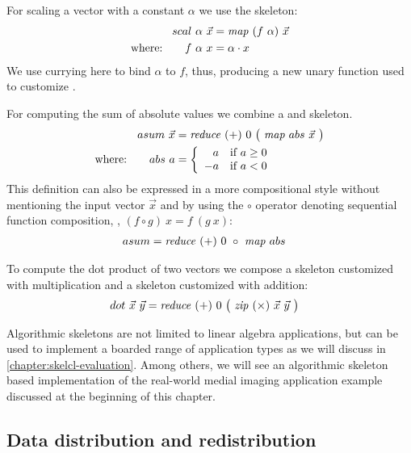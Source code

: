 For scaling a vector with a constant $\alpha$ we use the \map skeleton:
\begin{align*}
  scal\ \alpha\ \vec{x}&= \text{\textit{map}}\ (f\ \alpha)\ \vec{x}\\
  \text{where:} \qquad f\ \alpha\ x &= \alpha \cdot x
\end{align*}
We use currying here to bind $\alpha$ to $f$, thus, producing a new unary function used to customize \map.

For computing the sum of absolute values we combine a \map and \reduce skeleton.
\begin{align*}
  asum\ \vec{x} &= \text{\textit{reduce}}\ (+)\ 0\ \big(\ \text{\textit{map}}\ abs\ \vec{x}\ \big)\\
  \text{where:} \qquad abs\ a &=
    \left\{
      \begin{array}{r l}
      a & \text{if } a \geq 0\\
      -a & \text{if } a < 0
      \end{array}
    \right.
\end{align*}
This definition can also be expressed in a more compositional style without mentioning the input vector $\vec{x}$ and by using the $\circ$ operator denoting sequential function composition, \ie, $(f \circ g)\ x = f\ (g\ x)$:
\begin{align*}
  asum &= \text{\textit{reduce}}\ (+)\ 0\ \circ\ \text{\textit{map}}\ abs
\end{align*}

To compute the dot product of two vectors we compose a \zip skeleton customized with multiplication and a \reduce skeleton customized with addition:
\begin{align*}
  dot\ \vec{x}\ \vec{y} &= \text{\textit{reduce}}\ (+)\ 0\ \big(\ \text{\textit{zip}}\ (\times)\ \vec{x}\ \vec{y}\ \big)
\end{align*}

\noindent
Algorithmic skeletons are not limited to linear algebra applications, but can be used to implement a boarded range of application types as we will discuss in \autoref{chapter:skelcl-evaluation}.
Among others, we will see an algorithmic skeleton based implementation of the real-world medial imaging application example discussed at the beginning of this chapter.


\subsection{Data distribution and redistribution}
\label{section:skelcl-programming-model:distribution}

